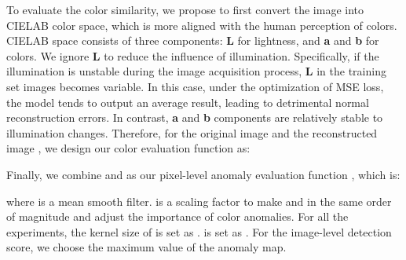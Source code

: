 \documentclass[5p, twocolumn]{elsarticle}[draft]
\begin{document}
To evaluate the color similarity, we propose to first convert the image into CIELAB color space, which is more aligned with the human perception of colors. CIELAB space consists of three components: \textbf{L} for lightness, and \textbf{a} and \textbf{b} for colors. We ignore \textbf{L} to reduce the influence of illumination. Specifically, if the illumination is unstable during the image acquisition process, \textbf{L} in the training set images becomes variable. In this case, under the optimization of MSE loss, the model tends to output an average result, leading to detrimental normal reconstruction errors. In contrast, \textbf{a} and \textbf{b} components are relatively stable to illumination changes. Therefore, for the original image  and the reconstructed image , we design our color evaluation function as:

Finally, we combine  and  as our pixel-level anomaly evaluation function , which is:

where  is a mean smooth filter.  is a scaling factor to make  and  in the same order of magnitude and adjust the importance of color anomalies. For all the experiments, the kernel size of  is set as .  is set as . For the image-level detection score, we choose the maximum value of the anomaly map.
\end{document}
